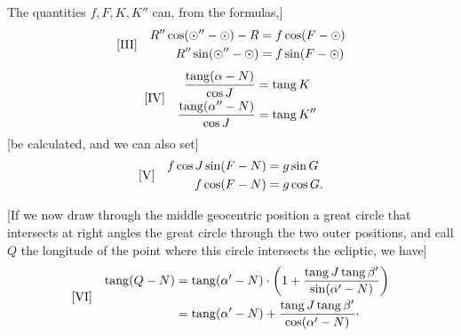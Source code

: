 The quantities \(f,F,K,K''\) can, from the formulas,]
\[
\begin{array}{l@{\quad}l}
[\mathrm{III}]&\begin{aligned}
R''\cos(\odot''-\odot)-R&=f\cos(F-\odot)\\
R''\sin(\odot''-\odot)&=f\sin(F-\odot)
\end{aligned}
\end{array}
\]
\[
\begin{array}{l@{\quad}l}
[\mathrm{IV}]&\begin{aligned}
\frac{\operatorname{tang}(\alpha-N)}{\cos J}&=\operatorname{tang}K\\
\frac{\operatorname{tang}(\alpha''-N)}{\cos J}&=\operatorname{tang}K''
\end{aligned}
\end{array}
\]
[be calculated, and we can also set]
\[
\begin{array}{l@{\quad}l}
[\mathrm{V}]&\begin{aligned}
f\cos J\sin(F-N)&=g\sin G\\
f\cos(F-N)&=g\cos G.
\end{aligned}
\end{array}
\]

[If we now draw through the middle geocentric position a great circle that intersects at right angles the great circle through the two outer positions, and call \(Q\) the longitude of the point where this circle intersects the ecliptic, we have]
\[
\begin{array}{l@{\quad}l}
[\mathrm{VI}]&\begin{aligned}
\operatorname{tang}(Q-N)&=\operatorname{tang}(\alpha'-N)\cdot\left(1+\frac{\operatorname{tang}J\operatorname{tang}\beta'}{\sin(\alpha'-N)}\right)\\
&=\operatorname{tang}(\alpha'-N)+\frac{\operatorname{tang}J\operatorname{tang}\beta'}{\cos(\alpha'-N)}\mathpunct{\cdot}
\end{aligned}
\end{array}
\]

